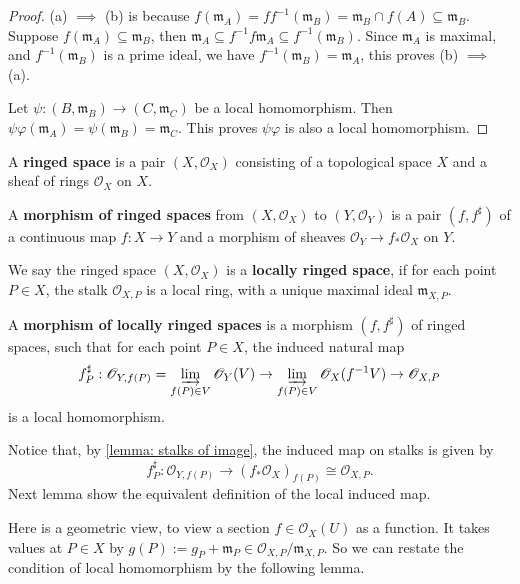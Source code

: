 \documentclass[11pt]{article}
\begin{document}
\begin{proof}
  (a) $ \implies $ (b) is because 
  $f(\mathfrak{m}_{A})= ff^{-1}(\mathfrak{m}_{B})= \mathfrak{m}_{B} \cap f(A) \subseteq \mathfrak{m}_{B} $. 
  Suppose $ f(\mathfrak{m}_{A}) \subseteq \mathfrak{m}_{B} $, 
  then $ \mathfrak{m}_{A} \subseteq f^{-1} f \mathfrak{m}_{A} \subseteq f^{-1}(\mathfrak{m}_{B}) $. 
  Since $ \mathfrak{m}_{A} $ is maximal, and $ f^{-1}(\mathfrak{m}_{B}) $ is a prime ideal, 
  we have $ f^{-1}(\mathfrak{m}_{B}) = \mathfrak{m}_{A} $, this proves (b) $ \implies $ (a).  

  Let $ \psi: (B,\mathfrak{m}_{B}) \to (C,\mathfrak{m}_{C}) $ be a local homomorphism. 
  Then $ \psi\varphi(\mathfrak{m}_{A})=\psi(\mathfrak{m}_{B})=\mathfrak{m}_{C} $. 
  This proves $ \psi \varphi $ is also a local homomorphism. 
\end{proof}



\begin{definition}
  A \textbf{ringed space} is a pair $ (X,\mathscr{O}_{X}) $ 
  consisting of a topological space $ X $ and a sheaf of rings 
  $ \mathscr{O}_{X} $ on $ X $. 

  A \textbf{morphism of ringed spaces} from $ (X,\mathscr{O}_{X}) $ to $ (Y,\mathscr{O}_{Y}) $ 
  is a pair $ (f,f^{\sharp}) $ of a continuous map $ f: X \to Y $ and a morphism of sheaves 
  $ \mathscr{O}_{Y} \to f_{*}\mathscr{O}_{X} $ on $ Y $. 

  We say the ringed space $ (X,\mathscr{O}_{X}) $ is a \textbf{locally ringed space}, 
  if for each point $ P \in X $, the stalk $ \mathscr{O}_{X,P} $ is a local ring, 
  with a unique maximal ideal $ \mathfrak{m}_{X,P} $. 

  A \textbf{morphism of locally ringed spaces} is a morphism $ (f,f^{\sharp}) $ of ringed spaces, 
  such that for each point $ P \in X $, the induced natural map 
  $$f_{P}^{\sharp}: \mathscr{O}_{Y,f(P)} = \varinjlim_{f(P) \in V} \mathscr{O}_{Y}(V) \to 
  \varinjlim_{f(P) \in V} \mathscr{O}_{X}(f^{-1}V) \to \mathscr{O}_{X,P} $$
  is a local homomorphism. 
\end{definition}

Notice that, by \autoref{lemma: stalks of image}, the induced map on stalks 
is given by 
$$ f_{P}^{\sharp}: \mathscr{O}_{Y,f(P)} \to (f_{*}\mathscr{O}_{X})_{f(P)}\cong \mathscr{O}_{X,P}. $$
Next lemma show the equivalent definition of the local induced map. 

Here is a geometric view, to view a section $ f \in \mathscr{O}_{X}(U) $ as a function. 
It takes values at $ P \in X $ by $ g(P):=g_{P} + \mathfrak{m}_{P} \in \mathscr{O}_{X,P}/\mathfrak{m}_{X,P} $. 
So we can restate the condition of local homomorphism by the following lemma. 
\end{document}
